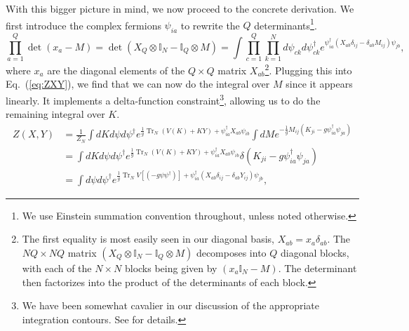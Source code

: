 \documentclass[english]{article}
\DeclareMathOperator{\Tr}{Tr}
\let\mb=\mathbb
\begin{document}
With this bigger picture in mind, we now proceed to the concrete derivation. We first introduce the complex fermions $\psi_{ia}$ to rewrite the $Q$ determinants\footnote{We use Einstein summation convention throughout, unless noted otherwise.}.
\begin{equation}
    \prod_{a=1}^{Q} \det\left(x_a -M \right) = \det\left( X_{Q} \otimes \mb{I}_{N} - \mb{I}_{Q} \otimes M \right) = \int \prod_{c=1}^{Q} \prod_{k=1}^{N}d\psi_{ck} d\psi^{\dagger}_{ck} e^{\psi^{\dagger}_{ia} \left(X_{ab}\delta_{ij}-\delta_{ab}M_{ij} \right) \psi_{jb}},
\end{equation}
where $x_a$ are the diagonal elements of the $Q \times Q$ matrix $X_{ab}$\footnote{The first equality is most easily seen in our diagonal basis, $X_{ab}=x_a \delta_{ab}$. The $NQ \times NQ$ matrix $(X_{Q} \otimes \mb{I}_{N} - \mb{I}_{Q} \otimes M)$ decomposes into $Q$ diagonal blocks, with each of the $N \times N$ blocks being given by $(x_a \mb{I}_{N}-M)$. The determinant then factorizes into the product of the determinants of each block.}. Plugging this into Eq.~(\ref{eq:ZXY}), we find that we can now do the integral over $M$ since it appears linearly. It implements a delta-function constraint\footnote{We have been somewhat cavalier in our discussion of the appropriate integration contours. See \cite{Hashimoto_2005} for details.}, allowing us to do the remaining integral over $K$.
\begin{align}
      Z(X,Y) & =  \frac{1}{Z_{N}}\int dK d\psi d\psi^{\dagger} e^{\frac{1}{g} \Tr_{N} \left( V(K)+KY \right)+\psi^{\dagger}_{ia} X_{ab} \psi_{ib}} \int dM e^{- \frac{1}{g}M_{ij} \left( K_{ji}- g \psi^{\dagger}_{ia}\psi_{ja}\right) } \label{eq:fermsin}\\
     & = \int dK d\psi d\psi^{\dagger} e^{\frac{1}{g} \Tr_{N} \left( V(K)+KY \right)+\psi^{\dagger}_{ia} X_{ab} \psi_{ib}} \delta \left( K_{ji}- g \psi^{\dagger}_{ia}\psi_{ja}\right) \label{eq:deltafnK}\\
    & =  \int d\psi d\psi^{\dagger} e^{\frac{1}{g} \Tr_{N} V\left[(-g \psi \psi^{\dagger}) \right]+\psi^{\dagger}_{ia}\left( X_{ab} \delta_{ij} - \delta_{ab} Y_{ij} \right) \psi_{jb}} \label{eq:onlyferms},
\end{align}
\end{document}
